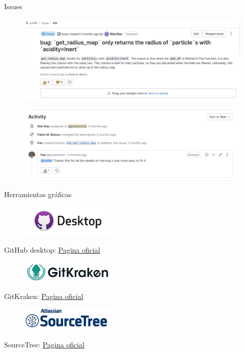 \documentclass{beamer}
\begin{document}
\begin{frame}{Issues}
  \begin{figure}
    \includegraphics[width=\textwidth]{images/issue.PNG}
  \end{figure}

  \begin{figure}
    \includegraphics[width=\textwidth]{images/issue-activity.PNG}
  \end{figure}

\end{frame}

\begin{frame} {Herramientas gráficas }
\centering 
    \begin{figure}
      \includegraphics[width=0.4\textwidth]{images/github-desktop.jpg}
    \end{figure}
    GitHub desktop: \href{https://desktop.github.com/}{Pagina oficial}

    \begin{figure}
      \includegraphics[width=0.4\textwidth]{images/gitkraken.jpg}
    \end{figure}
    GitKraken: \href{https://www.gitkraken.com/}{Pagina oficial}

    \begin{figure}
      \includegraphics[width=0.4\textwidth]{images/sourcetree.png}
    \end{figure}

    SourceTree: \href{https://www.sourcetreeapp.com/}{Pagina oficial}


\end{frame}
\end{document}
